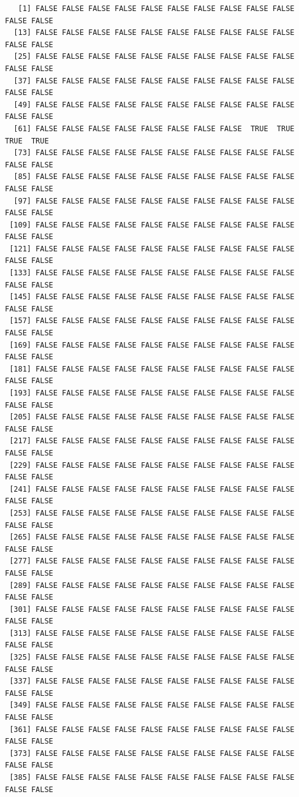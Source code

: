 \documentclass[
  letterpaper,
  DIV=11,
  numbers=noendperiod]{scrreprt}
\begin{document}
\begin{verbatim}
   [1] FALSE FALSE FALSE FALSE FALSE FALSE FALSE FALSE FALSE FALSE FALSE FALSE
  [13] FALSE FALSE FALSE FALSE FALSE FALSE FALSE FALSE FALSE FALSE FALSE FALSE
  [25] FALSE FALSE FALSE FALSE FALSE FALSE FALSE FALSE FALSE FALSE FALSE FALSE
  [37] FALSE FALSE FALSE FALSE FALSE FALSE FALSE FALSE FALSE FALSE FALSE FALSE
  [49] FALSE FALSE FALSE FALSE FALSE FALSE FALSE FALSE FALSE FALSE FALSE FALSE
  [61] FALSE FALSE FALSE FALSE FALSE FALSE FALSE FALSE  TRUE  TRUE  TRUE  TRUE
  [73] FALSE FALSE FALSE FALSE FALSE FALSE FALSE FALSE FALSE FALSE FALSE FALSE
  [85] FALSE FALSE FALSE FALSE FALSE FALSE FALSE FALSE FALSE FALSE FALSE FALSE
  [97] FALSE FALSE FALSE FALSE FALSE FALSE FALSE FALSE FALSE FALSE FALSE FALSE
 [109] FALSE FALSE FALSE FALSE FALSE FALSE FALSE FALSE FALSE FALSE FALSE FALSE
 [121] FALSE FALSE FALSE FALSE FALSE FALSE FALSE FALSE FALSE FALSE FALSE FALSE
 [133] FALSE FALSE FALSE FALSE FALSE FALSE FALSE FALSE FALSE FALSE FALSE FALSE
 [145] FALSE FALSE FALSE FALSE FALSE FALSE FALSE FALSE FALSE FALSE FALSE FALSE
 [157] FALSE FALSE FALSE FALSE FALSE FALSE FALSE FALSE FALSE FALSE FALSE FALSE
 [169] FALSE FALSE FALSE FALSE FALSE FALSE FALSE FALSE FALSE FALSE FALSE FALSE
 [181] FALSE FALSE FALSE FALSE FALSE FALSE FALSE FALSE FALSE FALSE FALSE FALSE
 [193] FALSE FALSE FALSE FALSE FALSE FALSE FALSE FALSE FALSE FALSE FALSE FALSE
 [205] FALSE FALSE FALSE FALSE FALSE FALSE FALSE FALSE FALSE FALSE FALSE FALSE
 [217] FALSE FALSE FALSE FALSE FALSE FALSE FALSE FALSE FALSE FALSE FALSE FALSE
 [229] FALSE FALSE FALSE FALSE FALSE FALSE FALSE FALSE FALSE FALSE FALSE FALSE
 [241] FALSE FALSE FALSE FALSE FALSE FALSE FALSE FALSE FALSE FALSE FALSE FALSE
 [253] FALSE FALSE FALSE FALSE FALSE FALSE FALSE FALSE FALSE FALSE FALSE FALSE
 [265] FALSE FALSE FALSE FALSE FALSE FALSE FALSE FALSE FALSE FALSE FALSE FALSE
 [277] FALSE FALSE FALSE FALSE FALSE FALSE FALSE FALSE FALSE FALSE FALSE FALSE
 [289] FALSE FALSE FALSE FALSE FALSE FALSE FALSE FALSE FALSE FALSE FALSE FALSE
 [301] FALSE FALSE FALSE FALSE FALSE FALSE FALSE FALSE FALSE FALSE FALSE FALSE
 [313] FALSE FALSE FALSE FALSE FALSE FALSE FALSE FALSE FALSE FALSE FALSE FALSE
 [325] FALSE FALSE FALSE FALSE FALSE FALSE FALSE FALSE FALSE FALSE FALSE FALSE
 [337] FALSE FALSE FALSE FALSE FALSE FALSE FALSE FALSE FALSE FALSE FALSE FALSE
 [349] FALSE FALSE FALSE FALSE FALSE FALSE FALSE FALSE FALSE FALSE FALSE FALSE
 [361] FALSE FALSE FALSE FALSE FALSE FALSE FALSE FALSE FALSE FALSE FALSE FALSE
 [373] FALSE FALSE FALSE FALSE FALSE FALSE FALSE FALSE FALSE FALSE FALSE FALSE
 [385] FALSE FALSE FALSE FALSE FALSE FALSE FALSE FALSE FALSE FALSE FALSE FALSE

\end{verbatim}
\end{document}
